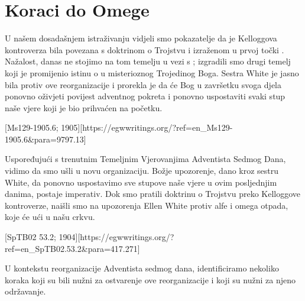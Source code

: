 \chapter{Koraci do Omege}

U našem dosadašnjem istraživanju vidjeli smo pokazatelje da je Kelloggova kontroverza bila povezana s doktrinom o Trojstvu i  izraženom u prvoj točki . Nažalost, danas ne stojimo na tom temelju u vezi s ; izgradili smo drugi temelj koji je promijenio istinu o  u misterioznog Trojedinog Boga. Sestra White je jasno bila protiv ove reorganizacije i prorekla je da će Bog u završetku svoga djela ponovno oživjeti povijest adventnog pokreta i ponovno uspostaviti svaki stup naše vjere koji je bio prihvaćen na početku.

[Ms129-1905.6; 1905][https://egwwritings.org/?ref=en\_Ms129-1905.6&para=9797.13]

Uspoređujući  s trenutnim Temeljnim Vjerovanjima Adventista Sedmog Dana, vidimo da smo ušli u novu organizaciju. Božje upozorenje, dano kroz sestru White, da ponovno uspostavimo sve stupove naše vjere u ovim posljednjim danima, postaje imperativ. Dok smo pratili doktrinu o Trojstvu preko Kelloggove kontroverze, naišli smo na upozorenja Ellen White protiv alfe i omega otpada, koje će ući u našu crkvu.

[SpTB02 53.2; 1904][https://egwwritings.org/?ref=en\_SpTB02.53.2&para=417.271]

U kontekstu reorganizacije Adventista sedmog dana, identificiramo nekoliko koraka koji su bili nužni za ostvarenje ove reorganizacije i koji su nužni za njeno održavanje.

